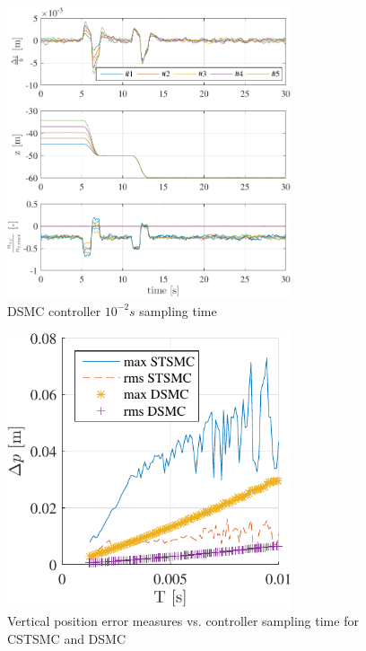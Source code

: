 \documentclass{ifacconf}
\begin{document}
\begin{figure}
\begin{center}
\includegraphics[width=8.4cm]{DSMC-100Hz-TIMESCALESEPARATION-turbulence=1}    %
\caption{ DSMC controller $10^{-2} s$ sampling time}
\label{fig:DSMC100Hz}
\end{center}
\end{figure}

\begin{figure}
\begin{center}
\includegraphics[width=8.4cm]{CSTSMC-DSMC-error-z-samplingtime.pdf}    %
\caption{Vertical position error measures vs. controller sampling time for CSTSMC and DSMC}
\label{fig:errorvssamplingtime}
\end{center}
\end{figure}

\FloatBarrier

\end{document}
